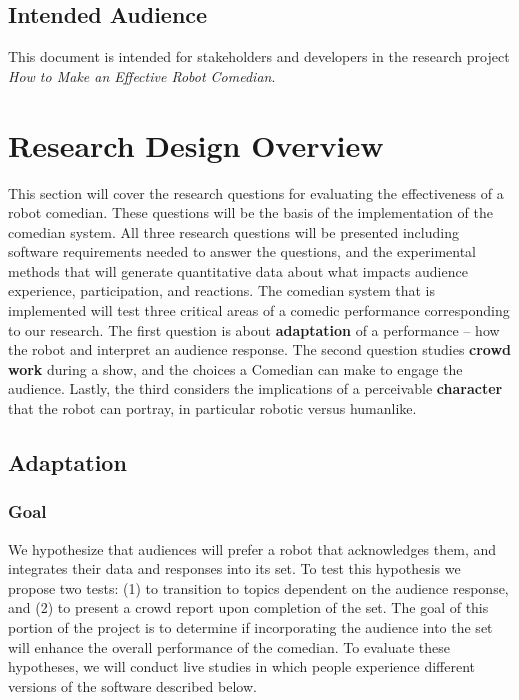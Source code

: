 \documentclass[onecolumn, draftclsnofoot,10pt, compsoc]{IEEEtran}
\begin{document}
\subsection{Intended Audience}
	This document is intended for stakeholders and developers in the research project \textit{How to Make an Effective Robot Comedian}.


\section{Research Design Overview}
This section will cover the research questions for evaluating the effectiveness of a robot comedian. These questions will
be the basis of the implementation of the comedian system. All three research questions will be presented including
software requirements needed to answer the questions, and the experimental methods that will generate quantitative
data about what impacts audience experience, participation, and reactions.
The comedian system that is implemented will test three critical areas of a comedic performance corresponding
to our research. The first question is about \textbf{adaptation} of a performance – how the robot and interpret an audience
response. The second question studies \textbf{crowd work} during a show, and the choices a Comedian can make to engage the
audience. Lastly, the third considers the implications of a perceivable \textbf{character} that the robot can portray, in particular robotic versus humanlike.


\subsection{Adaptation}
\subsubsection{Goal}
We hypothesize that audiences will prefer a robot that acknowledges them, and integrates their data and responses into
its set. To test this hypothesis we propose two tests: (1) to transition to topics dependent on the audience response,
and (2) to present a crowd report upon completion of the set. The goal of this portion of the project is to determine
if incorporating the audience into the set will enhance the overall performance of the comedian. To evaluate these
hypotheses, we will conduct live studies in which people experience different versions of the software described below.
\end{document}
